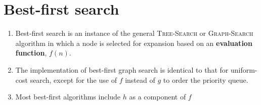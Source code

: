 \section{Best-first search \cite{ai/book/Artificial-Intelligence-A-Modern-Approach/Russell-Norvig}}
\label{AI: Algorithms/Best-first search}


\begin{enumerate}
    \item Best-first search is an instance of the general \textsc{Tree-Search} or \textsc{Graph-Search} algorithm in which a node is selected for expansion based on an \textbf{evaluation function}, $f(n)$.
    \hfill \cite{ai/book/Artificial-Intelligence-A-Modern-Approach/Russell-Norvig}

    \item The implementation of best-first graph search is identical to that for uniform-cost search, except for the use of $f$ instead of $g$ to order the priority queue.
    \hfill \cite{ai/book/Artificial-Intelligence-A-Modern-Approach/Russell-Norvig}

    \item Most best-first algorithms include $h$ as a component of $f$
    \hfill \cite{ai/book/Artificial-Intelligence-A-Modern-Approach/Russell-Norvig}
\end{enumerate}











